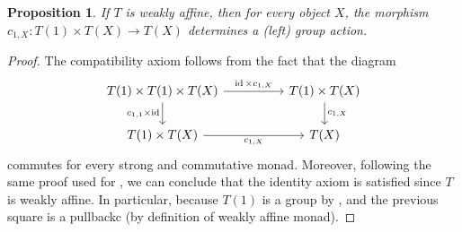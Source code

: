\documentclass[a4paper,UKenglish,numberwithinsect,cleveref, autoref, thm-restate]{lipics-v2021}
\theoremstyle{plain} %
\newtheorem{myproposition}[mytheorem]{Proposition}
\theoremstyle{definition} %
\begin{document}
\begin{myproposition}
	\label{lem:group_action}
	If $T$ is weakly affine, then for every object $X$, the morphism $c_{1,X}: T(1)\times T(X)\to T(X)$ determines a (left) group action. 

\end{myproposition}
\begin{proof}
	The compatibility axiom follows from the fact that the diagram
\[\begin{tikzcd}
	{T(1)\times T(1)\times T(X)} && {T(1)\times T(X)} \\
	{T(1)\times T(X)} && {T(X)}
	\arrow["{\id\times c_{1,X}}", from=1-1, to=1-3]
	\arrow["{c_{1,X}}", from=1-3, to=2-3]
	\arrow["{c_{1,1}\times \id}"', from=1-1, to=2-1]
	\arrow["{c_{1,X}}"', from=2-1, to=2-3]
\end{tikzcd}\]
commutes for every strong and commutative monad. Moreover, following the same proof used for , we can conclude that the identity axiom is satisfied since $T$ is weakly affine. In particular, because $T(1)$ is a group by , and the previous square is a pullbackc (by definition of weakly affine monad).
\end{proof}
\end{document}

